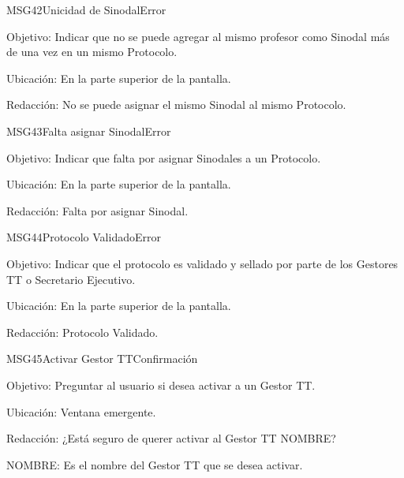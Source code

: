 \begin{mensaje}{MSG42}{Unicidad de Sinodal}{Error}
	\item[Objetivo:] Indicar que no se puede agregar al mismo profesor como Sinodal más de una vez en un mismo Protocolo.
	\item[Ubicación:] En la parte superior de la pantalla.
	\item[Redacción:] No se puede asignar el mismo Sinodal al mismo Protocolo.
\end{mensaje}

\begin{mensaje}{MSG43}{Falta asignar Sinodal}{Error}
	\item[Objetivo:] Indicar que falta por asignar Sinodales a un Protocolo.
	\item[Ubicación:] En la parte superior de la pantalla.
	\item[Redacción:] Falta por asignar Sinodal.
\end{mensaje}

\begin{mensaje}{MSG44}{Protocolo Validado}{Error}
	\item[Objetivo:] Indicar que el protocolo es validado y sellado por parte de los Gestores TT o Secretario Ejecutivo.
	\item[Ubicación:] En la parte superior de la pantalla.
	\item[Redacción:] Protocolo Validado.
\end{mensaje}

\begin{mensaje}{MSG45}{Activar Gestor TT}{Confirmación}
	\item[Objetivo:] Preguntar al usuario si desea activar a un Gestor TT.
	\item[Ubicación:] Ventana emergente.
	\item[Redacción:] ¿Está seguro de querer activar al Gestor TT NOMBRE?
	\begin{Citemize}
		\item NOMBRE: Es el nombre del Gestor TT que se desea activar.
	\end{Citemize}
\end{mensaje}

